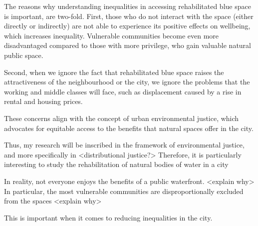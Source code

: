\documentclass{article}
\begin{document}
The reasons why understanding inequalities in accessing rehabilitated blue space is important, are two-fold. First, those who do not interact with the space (either directly or indirectly) are not able to experience its positive effects on wellbeing, which increases inequality. Vulnerable communities become even more disadvantaged compared to those with more privilege, who gain valuable natural public space.

Second, when we ignore the fact that rehabilitated blue space raises the attractiveness of the neighbourhood or the city, we ignore the problems that the working and middle classes will face, such as displacement caused by a rise in rental and housing prices. 

These concerns align with the concept of urban environmental justice, which advocates for equitable access to the benefits that natural spaces offer in the city.

Thus, my research will be inscribed in the framework of environmental justice, and more specifically in <distributional justice?>
Therefore, it is particularly interesting to study the rehabilitation of natural bodies of water in a city 

In reality, not everyone enjoys the benefits of a public waterfront. <explain why>
In particular, the most vulnerable communities are disproportionally excluded from the spaces <explain why>

This is important when it comes to reducing inequalities in the city.







\printbibliography
\end{document}
